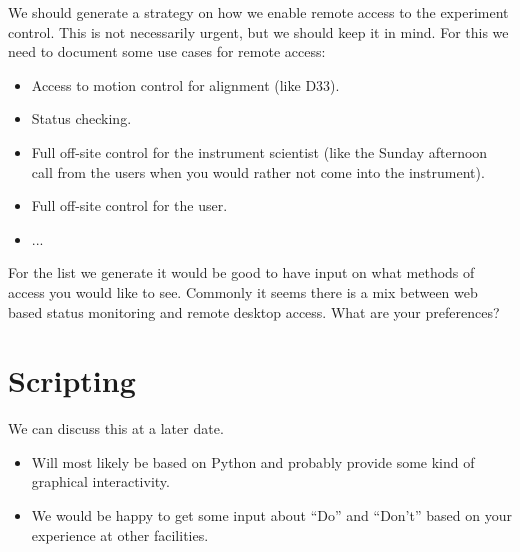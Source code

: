 \documentclass[a4paper,english,numbers=noenddot,bibliography=totoc,chapterprefix=on,DIV=12]{scrartcl}
\begin{document}
We should generate a strategy on how we enable remote access to the experiment control.
This is not necessarily urgent, but we should keep it in mind.
For this we need to document some use cases for remote access:
\begin{itemize}
  \item Access to motion control for alignment (like D33).
  \item Status checking.
  \item Full off-site control for the instrument scientist (like the Sunday afternoon call from the users when you would rather not come into the instrument).
  \item Full off-site control for the user.
  \item ...
\end{itemize}
For the list we generate it would be good to have input on what methods of access you would like to see.
Commonly it seems there is a mix between web based status monitoring and remote desktop access.
What are your preferences?


\section{Scripting}

We can discuss this at a later date.
\begin{itemize}
  \item Will most likely be based on Python and probably provide some kind of graphical interactivity.
  \item We would be happy to get some input about ``Do'' and ``Don't'' based on your experience at other facilities.
\end{itemize}
\end{document}
